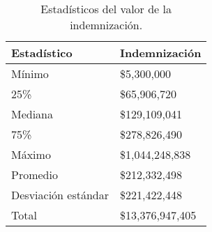 \begin{table}[!htbp]
\centering
\caption{Estadísticos del valor de la indemnización.} 
\label{tab:indemnizacion}
\begin{tabular}{ll}
  \hline
Estadístico & Indemnización \\ 
  \hline
Mínimo & \$5,300,000 \\ 
  25\% & \$65,906,720 \\ 
  Mediana & \$129,109,041 \\ 
  75\% & \$278,826,490 \\ 
  Máximo & \$1,044,248,838 \\ 
  Promedio & \$212,332,498 \\ 
  Desviación estándar & \$221,422,448 \\ 
  Total & \$13,376,947,405 \\ 
   \hline
\end{tabular}
\end{table}
